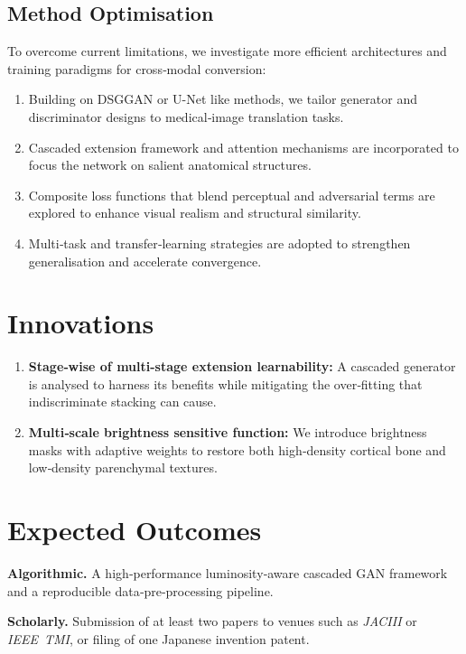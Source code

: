 \documentclass[twocolumn]{article}
\begin{document}
\subsection{Method Optimisation}
To overcome current limitations, we investigate more efficient architectures and training paradigms for cross‑modal conversion:
\begin{enumerate}
	\item Building on DSGGAN\cite{wang_dsg-gandual-stage-generator-based_2024} or U-Net\cite{navab_u-net_2015} like methods, we tailor generator and discriminator designs to medical‑image translation tasks.
	\item Cascaded extension framework and attention mechanisms are incorporated to focus the network on salient anatomical structures.
	\item Composite loss functions that blend perceptual and adversarial terms are explored to enhance visual realism and structural similarity.
	\item Multi‑task and transfer‑learning strategies are adopted to strengthen generalisation and accelerate convergence.
\end{enumerate}

\section{Innovations}
\begin{enumerate} \item \textbf{Stage‑wise of multi-stage extension learnability:} A cascaded generator is analysed to harness its benefits while mitigating the over‑fitting that indiscriminate stacking can cause.
	\item \textbf{Multi‑scale brightness sensitive function:} We introduce brightness masks with adaptive weights to restore both high‑density cortical bone and low‑density parenchymal textures.
\end{enumerate}

\section{Expected Outcomes}
\textbf{Algorithmic.} A high‑performance luminosity‑aware cascaded GAN framework and a reproducible data‑pre‑processing pipeline.

\textbf{Scholarly.} Submission of at least two papers to venues such as \emph{JACIII} or \emph{IEEE TMI}, or filing of one Japanese invention patent.








\end{document}
